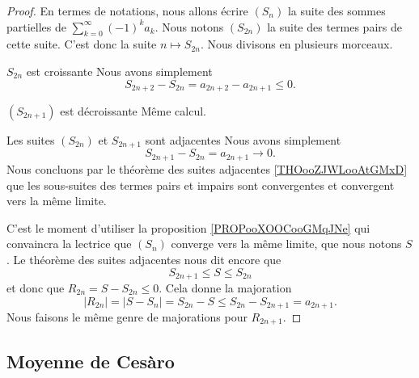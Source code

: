 \begin{proof}
    En termes de notations, nous allons écrire \( (S_n)\) la suite des sommes partielles de \( \sum_{k=0}^{\infty}(-1)^ka_k\). Nous notons \( (S_{2n})\) la suite des termes pairs de cette suite. C'est donc la suite \( n\mapsto S_{2n}\).
    Nous divisons en plusieurs morceaux.
    \begin{subproof}
        \item[\( S_{2n}\) est croissante]
            Nous avons simplement
            \begin{equation}
                S_{2n+2}-S_{2n}=a_{2n+2}-a_{2n+1}\leq 0.
            \end{equation}
        \item[\( (S_{2n+1})\) est décroissante]
            Même calcul.
        \item[Les suites \( (S_{2n})\) et \( S_{2n+1}\) sont adjacentes] Nous avons simplement
            \begin{equation}
                S_{2n+1}-S_{2n}=a_{2n+1}\to 0.
            \end{equation}
            Nous concluons par le théorème des suites adjacentes \ref{THOooZJWLooAtGMxD} que les sous-suites des termes pairs et impairs sont convergentes et convergent vers la même limite.
    \end{subproof}
    C'est le moment d'utiliser la proposition \ref{PROPooXOOCooGMqJNe} qui convaincra la lectrice que \( (S_n)\) converge vers la même limite, que nous notons \( S\). Le théorème des suites adjacentes nous dit encore que 
    \begin{equation}
        S_{2n+1}\leq S\leq S_{2n}
    \end{equation}
    et donc que \( R_{2n}=S-S_{2n}\leq 0\). Cela donne la majoration
    \begin{equation}
        | R_{2n} |=| S-S_n |=S_{2n}-S\leq S_{2n}-S_{2n+1}=a_{2n+1}.
    \end{equation}
    Nous faisons le même genre de majorations pour \( R_{2n+1}\).
\end{proof}

\subsection{Moyenne de Cesàro}

